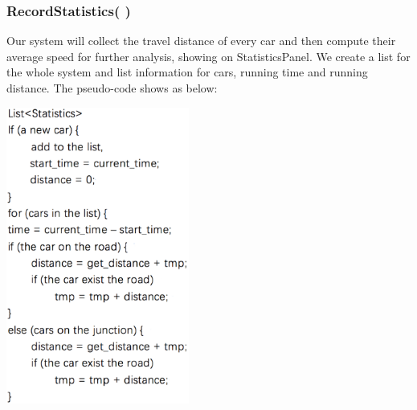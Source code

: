 \documentclass[a4paper,12pt]{article}
\begin{document}
\subsubsection{RecordStatistics( )}
Our system will collect the travel distance of every car and then compute their average speed for further analysis, showing on StatisticsPanel. We create a list for the whole system and list information for cars, running time and running distance. The pseudo-code shows as below:
\begin{center}
	\includegraphics[width=6cm] {GUI_p2.eps}
\end{center}
\end{document}
